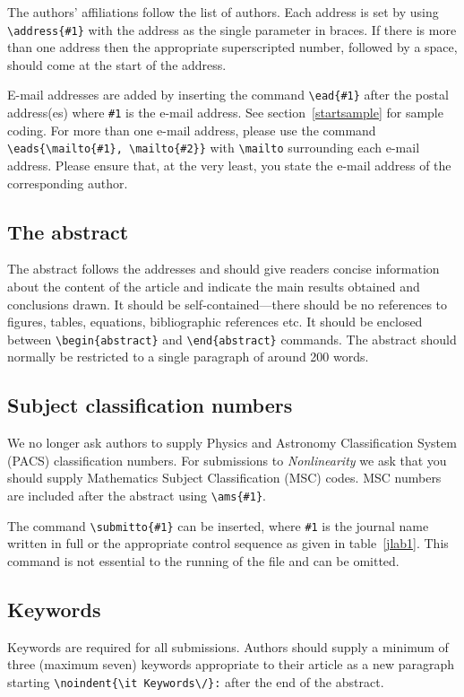 \documentclass[12pt]{iopart}
\begin{document}
The authors' affiliations follow the list of authors. 
Each address is set by using
\verb"\address{#1}" with the address as the single parameter in braces. 
If there is more 
than one address then the appropriate superscripted number, followed by a space, should come at the start of
the address.
 
E-mail addresses are added by inserting the 
command \verb"\ead{#1}" after the postal address(es) where \verb"#1" is the e-mail address.  
See section~\ref{startsample} for sample coding. For more than one e-mail address, please use the command 
\verb"\eads{\mailto{#1}, \mailto{#2}}" with \verb"\mailto" surrounding each e-mail address.  Please ensure
that, at the very least, you state the e-mail address of the corresponding author.

\subsection{The abstract}
The abstract follows the addresses and
should give readers concise information about the content 
of the article and indicate the main results obtained and conclusions 
drawn. It should be self-contained---there should be no references to 
figures, tables, equations, bibliographic references etc.  It should be enclosed between \verb"\begin{abstract}"
and \verb"\end{abstract}" commands.  The abstract should normally be restricted 
to a single paragraph of around 200 words.

\subsection{Subject classification numbers}
We no longer ask authors to supply Physics and Astronomy Classification System (PACS)
classification numbers.  For submissions to {\it Nonlinearity}\/ we ask that you should
supply Mathematics Subject Classification (MSC) codes.  MSC numbers are included after the abstract 
using \verb"\ams{#1}".

The command
\verb"\submitto{#1}" can be inserted, where \verb"#1" is the journal name written in full or the appropriate control sequence as
given in table~\ref{jlab1}. This command is not essential to the running of the file and can be omitted.

\subsection{Keywords}
Keywords are required for all submissions. Authors should supply a minimum of three (maximum seven) keywords appropriate to their article as a new paragraph starting \verb"\noindent{\it Keywords\/}:" after the end of the abstract.
\end{document}
